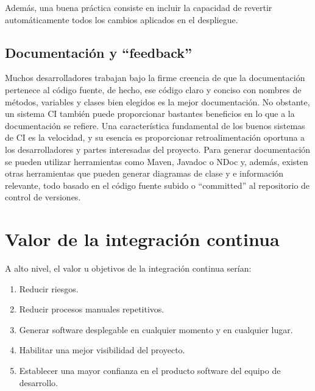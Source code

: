 Además, una buena práctica consiste en incluir la capacidad de revertir automáticamente todos los cambios aplicados en el despliegue.

\subsection{Documentación y “feedback”}
Muchos desarrolladores trabajan bajo la firme creencia de que la documentación pertenece al código fuente, de hecho, ese código claro y conciso con nombres de métodos, variables y clases bien elegidos es la mejor documentación. No obstante, un sistema CI también puede proporcionar bastantes beneficios en lo que a la documentación se refiere. Una característica fundamental de los buenos sistemas de CI es la velocidad, y su esencia es proporcionar retroalimentación oportuna a los desarrolladores y partes interesadas del proyecto. Para generar documentación se pueden utilizar herramientas como Maven, Javadoc o NDoc y, además, existen otras herramientas que pueden generar diagramas de clase y e información relevante, todo basado en el código fuente subido o “committed” al repositorio de control de versiones.

\section{Valor de la integración continua}
A alto nivel, el valor u objetivos de la integración continua serían:
\begin{enumerate}
    \item Reducir riesgos.
    \item Reducir procesos manuales repetitivos.
    \item Generar software desplegable en cualquier momento y en cualquier lugar.
    \item Habilitar una mejor visibilidad del proyecto.
    \item Establecer una mayor confianza en el producto software del equipo de desarrollo.
\end{enumerate}
